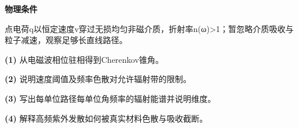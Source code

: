 \textbf{物理条件}\par 点电荷q以恒定速度v穿过无损均匀非磁介质，折射率n(ω)>1；暂忽略介质吸收与粒子减速，观察足够长直线路径。
\par\noindent\textbf{(1)} 从电磁波相位驻相得到Cherenkov锥角。
\par\noindent\textbf{(2)} 说明速度阈值及频率色散对允许辐射带的限制。
\par\noindent\textbf{(3)} 写出每单位路径每单位角频率的辐射能谱并说明维度。
\par\noindent\textbf{(4)} 解释高频紫外发散如何被真实材料色散与吸收截断。
